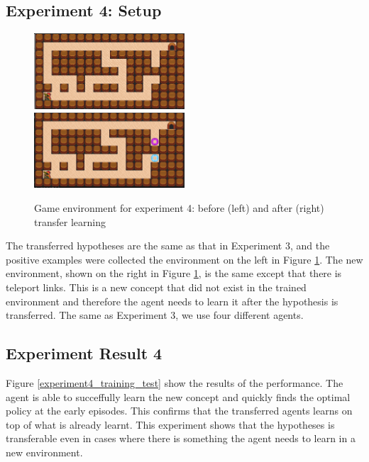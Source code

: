 \subsection{Experiment 4: Setup}
\label{subsec:experiement4_setup}
\begin{figure}[!htb]
\centerline{
\includegraphics[width=0.5\textwidth]{./figures/experiment4_before}
\includegraphics[width=0.5\textwidth]{./figures/experiment4_after}}
\caption{Game environment for experiment 4: before (left) and after (right) transfer learning}
\label{experiment4_setup}
\end{figure}

The transferred hypotheses are the same as that in Experiment 3, and the positive examples were collected the environment on the left in Figure \ref{experiment4_setup}.
The new environment, shown on the right in Figure \ref{experiment4_setup}, is the same except that there is teleport links.
This is a new concept that did not exist in the trained environment and therefore the agent needs to learn it after the hypothesis is transferred.
The same as Experiment 3, we use four different agents.

\subsection{Experiment Result 4}
\label{subsec:experiment_result_4}

Figure \ref{experiment4_training_test} show the results of the performance. The agent is able to succeffully learn the new concept and quickly finds the optimal policy at the early episodes.
This confirms that the transferred agents learns on top of what is already learnt. This experiment shows that the hypotheses is transferable even in cases where there is something the agent needs to learn in a new environment.


